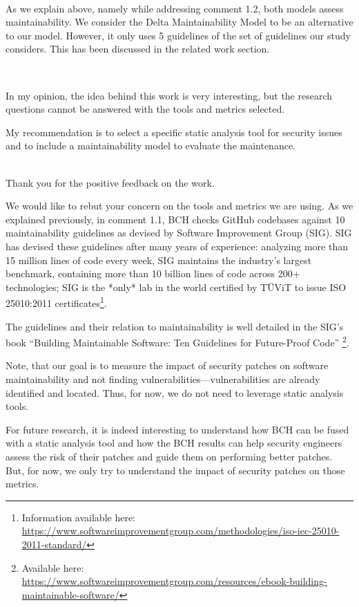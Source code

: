\documentclass[11pt,fleqn]{article}
\newcommand{\eline}{\vspace*{.75\baselineskip}}
\newcommand{\Referee}[1]{\eline \noindent {\bf Reviewer comment #1:} \\}
\newcommand{\Us}{\eline \noindent {\bf Response:}\\}
\newenvironment{revcomment}[1][]
{\Referee{#1}\begin{rcomment}}
{\end{rcomment}}
\begin{document}
\Us As we explain above, namely while addressing comment 1.2, both models assess 
maintainability. We consider the Delta Maintainability 
Model to be an alternative to our model. However, it only uses 5 guidelines of the 
set of guidelines our study considers. This has been 
discussed in the related work section.


\begin{revcomment}[1.5]

    In my opinion, the idea behind this work is very interesting, 
    but the research questions cannot be answered with the tools 
    and metrics selected. 

    My recommendation is to select a specific static analysis tool 
    for security issues and to include a maintainability model to 
    evaluate the maintenance.

\end{revcomment}

\Us Thank you for the positive feedback on the work. 

We would like to rebut your concern on the tools and 
metrics we are using. As we explained previously, in comment 1.1, 
BCH checks GitHub codebases against 10 maintainability guidelines 
as devised by Software Improvement Group (SIG). SIG has devised 
these guidelines after many years of experience: analyzing more 
than 15 million lines of code every week, SIG maintains the industry’s largest 
benchmark, containing more than 10 billion lines of code across 200+ technologies; SIG 
is the *only* lab in the world certified by TÜViT to issue ISO 25010:2011 
certificates\footnote{Information available here: 
\url{https://www.softwareimprovementgroup.com/methodologies/iso-iec-25010-2011-standard/}}.

The guidelines and their relation to maintainability is well 
detailed in the SIG's book ``Building Maintainable 
Software: Ten Guidelines for Future-Proof Code''
\footnote{Available here: \url{https://www.softwareimprovementgroup.com/resources/ebook-building-maintainable-software/}}.

Note, that our goal is to measure the impact of security patches on software 
maintainability and not finding vulnerabilities---vulnerabilities
are already identified and located. Thus, for now, 
we do not need to leverage static analysis tools. 

For future research, it is indeed interesting to 
understand how BCH can be fused with a static analysis tool 
and how the BCH results can help 
security engineers assess the risk of their patches and guide 
them on performing better patches. But, for now, we only try
to understand the impact of security patches on those metrics.
\end{document}
